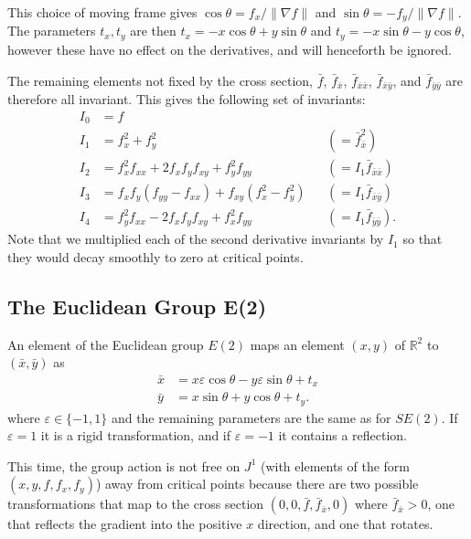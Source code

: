 \documentclass[review,onefignum,onetabnum]{siamonline190516}
\begin{document}
{This choice of moving frame gives $\cos\theta = f_x/\lVert\nabla f\rVert$
and $\sin\theta = -f_y/\lVert \nabla f \rVert$. The parameters $t_x, t_y$
are then $t_x = -x\cos\theta + y\sin\theta$ and $t_y = -x\sin\theta -
y\cos\theta$, however these have no effect on the derivatives, and will
henceforth be ignored.

The remaining elements not fixed by the cross section, $\bar{f}$,
$\bar{f}_{\bar{x}}$, $\bar{f}_{\bar{x}\bar{x}}$,
$\bar{f}_{\bar{x}\bar{y}}$, and $\bar{f}_{\bar{y}\bar{y}}$ are therefore
all invariant. This gives the following set of invariants:
\begin{equation}\label{eq:se2invariants}
\begin{aligned}
  I_0 &= f \\
  I_1 &= f_x^2 + f_y^2 & &(= \bar{f}_{\bar{x}}^2)\\
  I_2 &= f_x^2 f_{xx} + 2 f_x f_y f_{xy} + f_y^2 f_{yy} &&(= I_1\bar{f}_{\bar{x}\bar{x}}) \\
  I_3 &= f_x f_y (f_{yy} - f_{xx}) + f_{xy} (f_x^2 - f_y^2) &&(= I_1\bar{f}_{\bar{x}\bar{y}})\\
  I_4 &= f_y^2 f_{xx} - 2 f_x f_y f_{xy} + f_x^2 f_{yy} &&(= I_1\bar{f}_{\bar{y}\bar{y}}).
\end{aligned}
\end{equation}
Note that we multiplied each of the second derivative invariants by $I_1$
so that they would decay smoothly to zero at critical points.


\subsection{The Euclidean Group E(2)}
An element of the Euclidean group $E(2)$ maps an element $(x, y)$ of
$\mathbb{R}^2$ to $(\bar{x}, \bar{y})$ as 
\begin{equation*}
  \begin{aligned}
    \bar{x} &=  x\varepsilon\cos\theta  - y\varepsilon\sin\theta + t_x \\
    \bar{y} &= x\sin\theta  + y\cos\theta + t_y.
  \end{aligned}
\end{equation*}
where $\varepsilon \in \{-1, 1\}$ and the remaining parameters are the same
as for $SE(2)$. If $\varepsilon = 1$ it is a rigid transformation, and if
$\varepsilon = -1$ it contains a reflection.

This time, the group action is not free on $J^1$ (with elements of the form
$(x, y, f, f_x, f_y)$) away from critical points because there are two
possible transformations that map to the cross section $(0, 0, \bar{f},
\bar{f}_{\bar{x}}, 0)$ where $\bar{f}_{\bar{x}} > 0$, one that reflects the
gradient into the positive $x$ direction, and one that rotates. 

}
\end{document}
